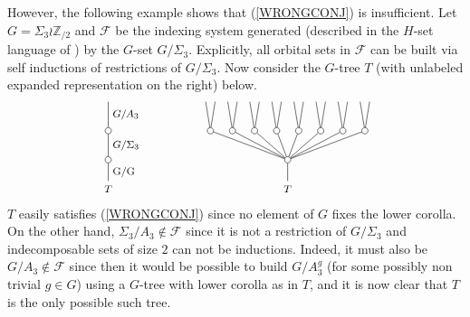 \documentclass[a4paper,10pt]{article}%
\begin{document}
\begin{remark}
  However, the following example shows that  
  (\ref{WRONGCONJ}) 
  is insufficient. Let $G = \Sigma_3 \wr \mathbb{Z}_{/2}$
  and $\mathcal{F}$ be the indexing system generated
  (described in the $H$-set language of \cite{BH15}) by the $G$-set $G/\Sigma_3$.
  Explicitly, all orbital sets in $\mathcal{F}$ can be built via self inductions of restrictions of $G/\Sigma_3$.
  Now consider the $G$-tree $T$ (with unlabeled expanded representation on the right) below.
  \begin{equation}
    \begin{tikzpicture}
      [grow=up,auto,level distance=2.3em,every node/.style = {font=\footnotesize},dummy/.style={circle,draw,inner sep=0pt,minimum size=1.75mm}]
      \tikzstyle{level 2}=[sibling distance = 1.75em]
      \tikzstyle{level 3}=[sibling distance = 0.75em]
      \node at (0,0) {$T$}
      child{node [dummy] {}
        child{node [dummy] {}
          child{
            edge from parent node [swap] {$G/A_3$} }
          edge from parent node [swap] {$G/\Sigma_3$} }
        edge from parent node [swap] {G/G}
      };
      \node at (5,0) {$T$}
      child{node [dummy] {}
        child{node [dummy] {}
          child
          child
        }
        child{node [dummy] {}
          child
          child
        }
        child{node [dummy] {}
          child
          child
        }
        child{node [dummy] {}
          child
          child
        }
        child{node [dummy] {}
          child
          child
        }
        child{node [dummy] {}
          child
          child
        }
        child{node [dummy] {}
          child
          child
        }
        child{node [dummy] {}
          child
          child
        }
      };
    \end{tikzpicture}
  \end{equation}
  $T$ easily satisfies (\ref{WRONGCONJ}) since no element of $G$ fixes the lower corolla. On the other hand, $\Sigma_3/A_3 \nin \mathcal{F}$ since it is not a restriction of $G/\Sigma_3$ and indecomposable sets of size $2$ can not be inductions. Indeed, it must also be $G/A_3 \nin \mathcal{F}$
  since then it would be possible to build $G/A_3^g$ (for some possibly non trivial $g \in G$) using a $G$-tree with lower corolla as in $T$, and it is now clear that $T$ is the only possible such tree.
\end{remark}







\newpage
\end{document}
